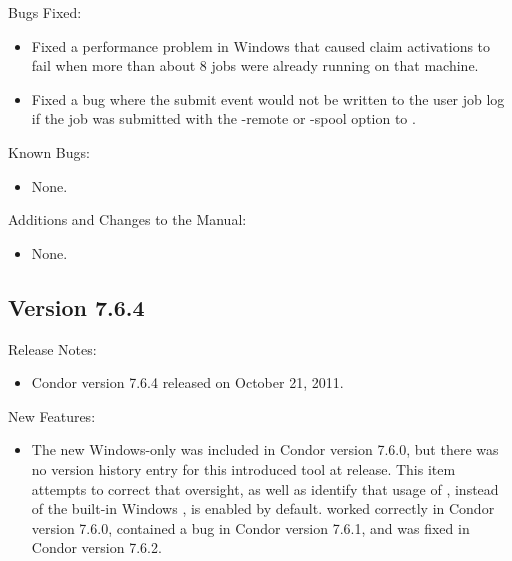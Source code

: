 \noindent Bugs Fixed:

\begin{itemize}

\item Fixed a performance problem in Windows that caused claim activations to
fail when more than about 8 jobs were already running on that machine.

\item Fixed a bug where the submit event would not be written to the user
job log if the job was submitted with the -remote or -spool option to
.

\end{itemize}

\noindent Known Bugs:

\begin{itemize}

\item None.

\end{itemize}

\noindent Additions and Changes to the Manual:

\begin{itemize}

\item None.

\end{itemize}


\subsection*{\label{sec:New-7-6-4}Version 7.6.4}

\noindent Release Notes:

\begin{itemize}

\item Condor version 7.6.4 released on October 21, 2011.

\end{itemize}


\noindent New Features:

\begin{itemize}

\item The new Windows-only  was included in Condor version 7.6.0,
but there was no version history entry for this introduced tool at release.
This item attempts to correct that oversight, 
as well as identify that usage of ,
instead of the built-in Windows , 
is enabled by default.
 worked correctly in Condor version 7.6.0, 
contained a bug in Condor version 7.6.1,
and was fixed in Condor version 7.6.2.


\end{itemize}

